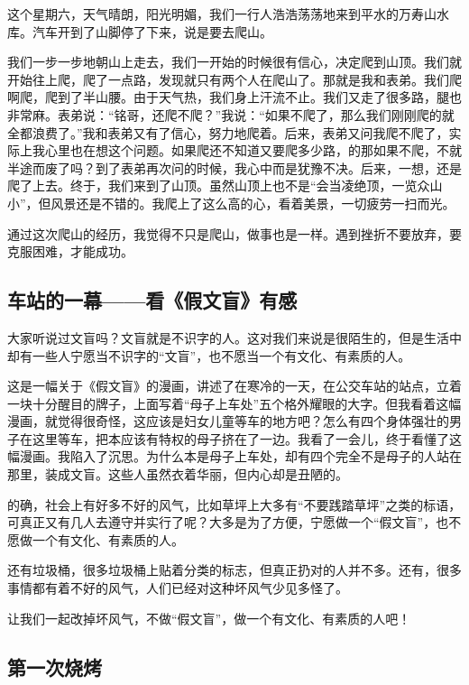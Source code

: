 \documentclass[UTF8,a4paper,titlepage,twoside,10.5pt]{article}
\begin{document}
这个星期六，天气晴朗，阳光明媚，我们一行人浩浩荡荡地来到平水的万寿山水库。汽车开到了山脚停了下来，说是要去爬山。

我们一步一步地朝山上走去，我们一开始的时候很有信心，决定爬到山顶。我们就开始往上爬，爬了一点路，发现就只有两个人在爬山了。那就是我和表弟。我们爬啊爬，爬到了半山腰。由于天气热，我们身上汗流不止。我们又走了很多路，腿也非常麻。表弟说：“铭哥，还爬不爬？”我说：“如果不爬了，那么我们刚刚爬的就全都浪费了。”我和表弟又有了信心，努力地爬着。后来，表弟又问我爬不爬了，实际上我心里也在想这个问题。如果爬还不知道又要爬多少路，的那如果不爬，不就半途而废了吗？到了表弟再次问的时候，我心中而是犹豫不决。后来，一想，还是爬了上去。终于，我们来到了山顶。虽然山顶上也不是“会当凌绝顶，一览众山小”，但风景还是不错的。我爬上了这么高的心，看着美景，一切疲劳一扫而光。

通过这次爬山的经历，我觉得不只是爬山，做事也是一样。遇到挫折不要放弃，要克服困难，才能成功。

\subsection{车站的一幕——看《假文盲》有感}
\label{sec:org86acfe9}

大家听说过文盲吗？文盲就是不识字的人。这对我们来说是很陌生的，但是生活中却有一些人宁愿当不识字的“文盲”，也不愿当一个有文化、有素质的人。

这是一幅关于《假文盲》的漫画，讲述了在寒冷的一天，在公交车站的站点，立着一块十分醒目的牌子，上面写着“母子上车处”五个格外耀眼的大字。但我看着这幅漫画，就觉得很奇怪，这应该是妇女儿童等车的地方吧？怎么有四个身体强壮的男子在这里等车，把本应该有特权的母子挤在了一边。我看了一会儿，终于看懂了这幅漫画。我陷入了沉思。为什么本是母子上车处，却有四个完全不是母子的人站在那里，装成文盲。这些人虽然衣着华丽，但内心却是丑陋的。

的确，社会上有好多不好的风气，比如草坪上大多有“不要践踏草坪”之类的标语，可真正又有几人去遵守并实行了呢？大多是为了方便，宁愿做一个“假文盲”，也不愿做一个有文化、有素质的人。

还有垃圾桶，很多垃圾桶上贴着分类的标志，但真正扔对的人并不多。还有，很多事情都有着不好的风气，人们已经对这种坏风气少见多怪了。

让我们一起改掉坏风气，不做“假文盲”，做一个有文化、有素质的人吧！

\subsection{第一次烧烤}
\label{sec:orgde5be77}
\end{document}
